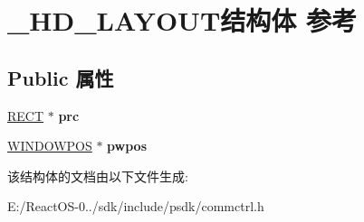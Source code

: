 \hypertarget{struct___h_d___l_a_y_o_u_t}{}\section{\+\_\+\+H\+D\+\_\+\+L\+A\+Y\+O\+U\+T结构体 参考}
\label{struct___h_d___l_a_y_o_u_t}
\subsection*{Public 属性}
\begin{DoxyCompactItemize}
\item 
\mbox{\label{struct___h_d___l_a_y_o_u_t_ace4e5b5d02f53761f56136fa9e7f62d5}} 
\hyperlink{structtag_r_e_c_t}{R\+E\+CT} $\ast$ {\bfseries prc}
\item 
\mbox{\label{struct___h_d___l_a_y_o_u_t_ab26d3b81e1b63d21c25cb79e6fc71a5c}} 
\hyperlink{struct___w_i_n_d_o_w_p_o_s}{W\+I\+N\+D\+O\+W\+P\+OS} $\ast$ {\bfseries pwpos}
\end{DoxyCompactItemize}


该结构体的文档由以下文件生成\+:\begin{DoxyCompactItemize}
\item 
E\+:/\+React\+O\+S-\/0../sdk/include/psdk/commctrl.\+h\end{DoxyCompactItemize}
